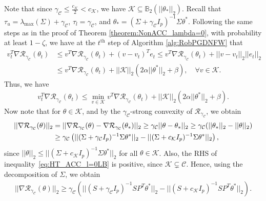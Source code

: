 \documentclass{article}
\begin{document}
Note that since $\gamma_{\mathcal{C}} \leq \frac{c_{\mathcal{K}}}{2} < c_{\mathcal{K}}$, we have  $\mathcal{K} \subseteq \mathbb{B}_2(||\theta_*||_2)$. Recall that $\tau_u = \lambda_{\max}(\Sigma) + \gamma_{\mathcal{C}}$, $\tau_l = \gamma_{\mathcal{C}}$, and $\theta_* = (\Sigma + \gamma_{\mathcal{C}}I_p)^{-1}\Sigma\theta^*$. Following the same steps as in the proof of Theorem \ref{theorem:NonACC_lambda=0}, with probability at least $1 - \zeta$, we have at the $t^{\text{th}}$ step of Algorithm \ref{alg:RobPGDNFW} that
\begin{align*}
v_t^T\nabla\mathcal{R}_{\gamma_{\mathcal{C}}}(\theta_t) &\leq v^T\nabla\mathcal{R}_{\gamma_{\mathcal{C}}}(\theta_t) + (v - v_t)^Te_t \leq v^T\nabla\mathcal{R}_{\gamma_{\mathcal{C}}}(\theta_t) + ||v - v_t||_2||e_t||_2\\
&\leq v^T\nabla\mathcal{R}_{\gamma_{\mathcal{C}}}(\theta_t) + ||\mathcal{K}||_2(2\alpha ||\theta^*||_2 + \beta), \quad \forall v \in \mathcal{K}.
\end{align*}
Thus, we have
\begin{align*}
v_t^T\nabla\mathcal{R}_{\gamma_{\mathcal{C}}}(\theta_t) \leq \mathop{\min}\limits_{v \in \mathcal{K}}v^T\nabla\mathcal{R}_{\gamma_{\mathcal{C}}}(\theta_t) + ||\mathcal{K}||_2(2\alpha ||\theta^*||_2 + \beta).
\end{align*}
Now note that for $\theta \in \mathcal{K}$, and by the $\gamma_{\mathcal{C}}$-strong convexity of $\mathcal{R}_{\gamma_{\mathcal{C}}}$, we obtain
\begin{align}
\label{eq:HT_ACC_l=0LB}
||\nabla\mathcal{R}_{\gamma_{\mathcal{C}}}(\theta)||_2 &= ||\nabla\mathcal{R}_{\gamma_{\mathcal{C}}}(\theta) - \nabla\mathcal{R}_{\gamma_{\mathcal{C}}}(\theta_{*})||_2 \geq \gamma_{\mathcal{C}}||\theta - \theta_{*}||_2 \geq \gamma_{\mathcal{C}}(||\theta_{*}||_2 - ||\theta||_2) \notag\\
&\geq \gamma_{\mathcal{C}}\left(||(\Sigma + \gamma_{\mathcal{C}}I_p)^{-1}\Sigma\theta^*||_2 - ||(\Sigma + c_{\mathcal{K}}I_p)^{-1}\Sigma\theta^*||_2\right),
\end{align}
since $||\theta||_2 \leq ||(\Sigma + c_{\mathcal{K}}I_p)^{-1}\Sigma\theta^*||_2$ for all $\theta \in \mathcal{K}$. Also, the RHS of inequality~\eqref{eq:HT_ACC_l=0LB} is positive, since $\mathcal{K} \subsetneq \mathcal{C}$. Hence, using the decomposition of $\Sigma$, we obtain
\begin{align*}
||\nabla\mathcal{R}_{\gamma_{\mathcal{C}}}(\theta)||_2 \geq \gamma_{\mathcal{C}}\left(||(S + \gamma_{\mathcal{C}}I_p)^{-1}SP^T\theta^*||_2 - ||(S + c_{\mathcal{K}}I_p)^{-1}SP^T\theta^*||_2\right).
\end{align*}
\end{document}
